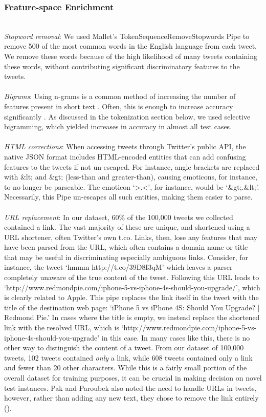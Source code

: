 \documentclass[letterpaper]{article}
\begin{document}
\subsubsection{Feature-space Enrichment} ~\\
\textit{Stopword removal}: We used Mallet's TokenSequenceRemoveStopwords Pipe to remove 500 of the most common words in the English language from each tweet. We remove these words because of the high likelihood of many tweets containing these words, without contributing significant discriminatory features to the tweets.
\\
~\\
\textit{Bigrams}: Using n-grams is a common method of increasing the number of features present in short text%
. Often, this is enough to increase accuracy significantly%
. As discussed in the tokenization section below, we used selective bigramming, which yielded increases in accuracy in almost all test cases.\\
~\\
\textit{HTML corrections}: When accessing tweets through Twitter's public API, the native JSON format includes HTML-encoded entities that can add confusing features to the tweets if not un-escaped. For instance, angle brackets are replaced with \&lt; and \&gt; (less-than and greater-than), causing emoticons, for instance, to no longer be parseable. The emoticon `\textgreater.\textless', for instance, would be `\&gt;.\&lt;'. Necessarily, this Pipe un-escapes all such entities, making them easier to parse.\\
~\\
\textit{URL replacement}: In our dataset, 60\% of the 100,000 tweets we collected contained a link. The vast majority of these are unique, and shortened using a URL shortener, often Twitter's own t.co. Links, then, lose any features that may have been parsed from the URL, which often contains a domain name or title that may be useful in discriminating especially ambiguous links. Consider, for instance, the tweet `hmmm http://t.co/39D8I3qM' which leaves a parser completely unaware of the true content of the tweet. Following this URL leads to `http://www.redmondpie.com/iphone-5-vs-iphone-4s-should-you-upgrade/', which is clearly related to Apple. This pipe replaces the link itself in the tweet with the title of the destination web page: `iPhone 5 vs iPhone 4S: Should You Upgrade? | Redmond Pie.' In cases where the title is empty, we instead replace the shortened link with the resolved URL, which is `http://www.redmondpie.com/iphone-5-vs-iphone-4s-should-you-upgrade' in this case. In many cases like this, there is no other way to distinguish the content of a tweet. From our dataset of 100,000 tweets, 102 tweets contained \textit{only} a link, while 608 tweets contained only a link and fewer than 20 other characters. While this is a fairly small portion of the overall dataset for training purposes, it can be crucial in making decision on novel test instances. Pak and Paroubek also noted the need to handle URLs in tweets, however, rather than adding any new text, they chose to remove the link entirely  (\citeauthor{PAK10.385}). \\
\end{document}
